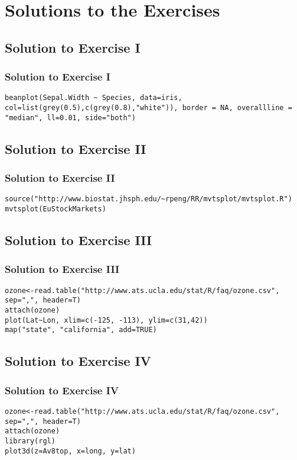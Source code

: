 \section[Solutions]{Solutions to the Exercises}
  \subsection{Solution to Exercise I}
\begin{frame}[fragile]
  \frametitle{Solution to Exercise I}

			\begin{lstlisting}
beanplot(Sepal.Width ~ Species, data=iris, col=list(grey(0.5),c(grey(0.8),"white")), border = NA, overallline = "median", ll=0.01, side="both")
			\end{lstlisting}
\end{frame}

  \subsection{Solution to Exercise II}
  \begin{frame}[fragile]
  \frametitle{Solution to Exercise II}

			\begin{lstlisting}
source("http://www.biostat.jhsph.edu/~rpeng/RR/mvtsplot/mvtsplot.R")		
mvtsplot(EuStockMarkets)
			\end{lstlisting}
\end{frame}

  \subsection{Solution to Exercise III}
\begin{frame}[fragile]
  \frametitle{Solution to Exercise III}

			\begin{lstlisting}
ozone<-read.table("http://www.ats.ucla.edu/stat/R/faq/ozone.csv", sep=",", header=T)
attach(ozone)
plot(Lat~Lon, xlim=c(-125, -113), ylim=c(31,42))
map("state", "california", add=TRUE)
			\end{lstlisting}

\end{frame}

\subsection{Solution to Exercise IV}
  \begin{frame}[fragile]
  \frametitle{Solution to Exercise IV}
 		\begin{lstlisting}
ozone<-read.table("http://www.ats.ucla.edu/stat/R/faq/ozone.csv", sep=",", header=T)
attach(ozone)
library(rgl)
plot3d(z=Av8top, x=long, y=lat)
 		\end{lstlisting}
\end{frame}

